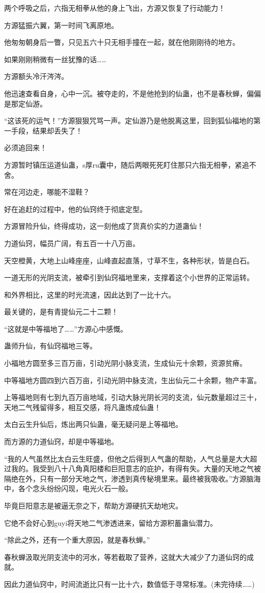 \begin{this_body}
两个呼吸之后，六指无相拳从他的身上飞出，方源又恢复了行动能力！

方源猛振六翼，第一时间飞离原地。

他匆匆朝身后一瞥，只见五六十只无相手撞在一起，就在他刚刚待的地方。

如果刚刚稍微有一丝犹豫的话……

方源额头冷汗涔涔。

他迅速查看自身，心中一沉。被夺走的，不是他抢到的仙蛊，也不是春秋蝉，偏偏是那定仙游。

“这该死的运气！”方源狠狠咒骂一声。定仙游乃是他脱离这里，回到狐仙福地的第一手段，结果却丢失了！

必须追回来！

方源暂时镇压运道仙蛊，s厚ru囊中，随后两眼死死盯住那只六指无相拳，紧追不舍。

常在河边走，哪能不湿鞋？

好在追赶的过程中，他的仙窍终于彻底定型。

方源冒险升仙，终得成功，这一刻他成了货真价实的力道蛊仙！

力道仙窍，幅员广阔，有五百一十八万亩。

天空橙黄，大地上山峰座座，山峰直起直落，寸草不生，各种形状，皆是白石。

一道无形的光阴支流，被牵引到仙窍福地里来，支撑着这个小世界的正常运转。

和外界相比，这里的时光流速，因此达到了一比十六。

最关键的，是有青提仙元二十二颗！

“这就是中等福地了……”方源心中感慨。

蛊师升仙，有仙窍福地三等。

小福地方圆至多三百万亩，引动光阴小脉支流，生成仙元十余颗，资源贫瘠。

中等福地方圆四到六百万亩，引动光阴中脉支流，生出仙元二十余颗，物产丰富。

上等福地则有七到九百万亩地域，引动大脉光阴长河的支流，仙元数量超过三十，天地二气残留得多，相互交感，将凡蛊炼成仙蛊！

太白云生升仙后，炼出两只仙蛊，毫无疑问是上等福地。

而方源的力道仙窍，却是中等福地。

“我的人气虽然比太白云生旺盛，但他之后得到人气蛊的帮助，人气总量是大大超过我的。我受到八十八角真阳楼和巨阳意志的庇护，有得有失。大量的天地之气被隔绝在外，只有一部分天地之气，渗透到真传秘境里来。最终被我吸收。”方源脑海中，各个念头纷纷闪现，电光火石一般。

毕竟巨阳意志是被逼无奈之下，帮助方源硬抗天劫地灾。

它绝不会好心到guyi将天地二气渗透进来，留给方源积蓄蛊仙潜力。

“除此之外，还有一个重大原因，就是春秋蝉。”

春秋蝉汲取光阴支流中的河水，等若截取了营养，这就大大减少了力道仙窍的成就。

因此力道仙窍中，时间流逝比只有一比十六，数值低于寻常标准。(未完待续……)

\end{this_body}

